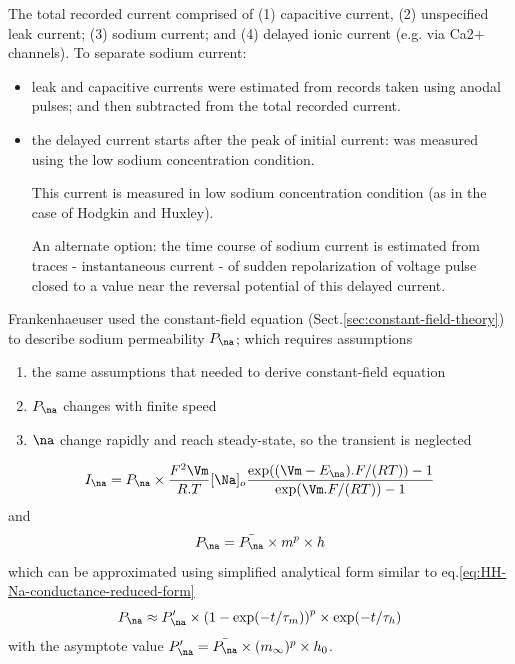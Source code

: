 The total recorded current comprised of (1) capacitive current, (2) unspecified
leak current; (3) sodium current; and (4) delayed ionic current (e.g. via Ca2+
channels). To separate sodium current:
\begin{itemize}
  \item leak and capacitive currents were estimated from records taken using
  anodal pulses; and then subtracted from the total recorded current. 
  
  \item the delayed current starts after the peak of initial current: was
  measured using the low sodium concentration condition.
  
  This current is measured in low sodium concentration condition (as in the
  case of Hodgkin and Huxley).
  
  An alternate option: the time course of sodium current is estimated
  from traces - instantaneous current - of sudden repolarization of voltage
  pulse closed to a value near the reversal potential of this delayed current. 

\end{itemize}

Frankenhaeuser used the constant-field equation
(Sect.\ref{sec:constant-field-theory}) to describe sodium permeability $P_\na$;
which requires assumptions
\begin{enumerate}
  \item the same assumptions that needed to derive constant-field equation
  \item $P_\na$ changes with finite speed
  
  \item $\na$ change rapidly and reach steady-state, so the transient is
  neglected
\end{enumerate}

\begin{equation}
I_\na = P_\na \times \frac{F^2 \Vm}{R.T} [\Na]_o \frac{\exp((\Vm-E_\na).F/(RT)) 
- 1}{\exp(\Vm.F/(RT)) - 1}
\end{equation}
and 
\begin{equation}
P_\na = \bar{P_\na} \times m^p \times h
\end{equation}
which can be approximated using simplified analytical form similar to
eq.\ref{eq:HH-Na-conductance-reduced-form}
\begin{equation}
P_\na \approx P'_\na \times \left( 1 - \exp(-t/\tau_m)\right)^p \times
\exp(-t/\tau_h) 
\end{equation}
with the asymptote value $P'_\na = \bar{P_\na} \times (m_\infty)^p \times h_0$.

